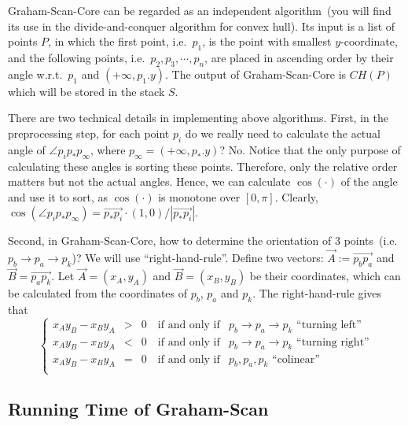 Graham-Scan-Core can be regarded as an independent algorithm~(you will find its use
in the divide-and-conquer algorithm for convex hull). Its input
is a list of points $P$, in which the first point, i.e.\ $p_1$, is the point with smallest $y$-coordinate,
and the following points, i.e.\ $p_2, p_3, \cdots, p_n$, are placed in ascending order
by their angle w.r.t.\ $p_1$ and $(+\infty, p_1.y)$. The output of Graham-Scan-Core
is $CH(P)$ which will be stored in the stack $S$.

There are two technical details in implementing above algorithms.
First, in the preprocessing step, for each point $p_i$ do we really need to calculate the actual angle
of $\angle p_ip_*p_{\infty}$, where $p_{\infty} = (+\infty, p_*.y)$?
No. Notice that the only purpose of calculating these angles is sorting these points.
Therefore, only the relative order matters but not the actual angles.
Hence, we can calculate $\cos(\cdot)$ of the angle and use it to sort,
as $\cos(\cdot)$ is monotone over $[0,\pi]$. Clearly,
$\cos( \angle p_ip_*p_{\infty} ) = \overrightarrow{p_*p_i}\cdot (1, 0) / |\overrightarrow{p_*p_i}|$.

Second, in Graham-Scan-Core, how to determine
the orientation of 3 points~(i.e.\ $p_b \to p_a \to p_k$)? We will use ``right-hand-rule''.
Define two vectors: $\overrightarrow{A} := \overrightarrow{p_bp_a}$ and $\overrightarrow{B} = \overrightarrow{p_ap_k}$.
Let $\overrightarrow{A} = (x_A,y_A)$ and $\overrightarrow{B}= (x_B, y_B)$ be their coordinates,
which can be calculated from the coordinates of $p_b$, $p_a$ and $p_k$.
The right-hand-rule gives that
\begin{displaymath}
\left\{
	\begin{array}{rccl}
		x_Ay_B - x_By_A & > & 0 \quad \textrm{if and only if} & p_b \to p_a \to p_k \textrm{\ ``turning left''} \\
		x_Ay_B - x_By_A & < & 0 \quad \textrm{if and only if} & p_b \to p_a \to p_k \textrm{\ ``turning right''} \\
		x_Ay_B - x_By_A & = & 0 \quad \textrm{if and only if} & p_b, p_a, p_k \textrm{\ ``colinear''} \\
	\end{array}
\right.
\end{displaymath}

\subsection*{Running Time of Graham-Scan}

